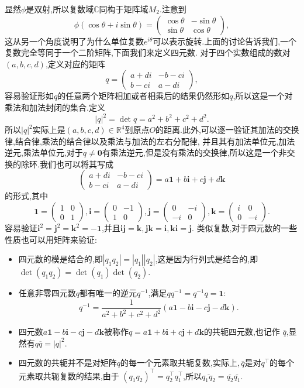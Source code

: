 \documentclass[10pt,a4paper]{ctexbook}
\theoremstyle{definition}
\begin{document}
显然$\phi$是双射,所以复数域$\mathbb{C}$同构于矩阵域$M_2$.注意到
\[
    \phi(\cos\theta+i\sin\theta)=\begin{pmatrix}
        \cos\theta & -\sin\theta \\ \sin\theta & \cos\theta
    \end{pmatrix},
\]
这从另一个角度说明了为什么单位复数$e^{i\theta}$可以表示旋转.上面的讨论告诉我们,一个复数完全等同于一个二阶矩阵,下面我们来定义四元数.%
对于四个实数组成的数对$(a,b,c,d)$,定义对应的矩阵
\[
    q=\begin{pmatrix}
        a+di & -b-ci \\ b-ci & a-di
    \end{pmatrix},
\]
容易验证形如$q$的任意两个矩阵相加或者相乘后的结果仍然形如$q$,所以这是一个对乘法和加法封闭的集合.定义
\[
    |q|^2=\det q=a^2+b^2+c^2+d^2.
\]
所以$|q|^2$实际上是$(a,b,c,d)\in\mathbb{R}^4$到原点$O$的距离.此外,可以逐一验证其加法的交换律,结合律,乘法的结合律以及乘法与加法的左右分配律,%
并且其有加法单位元,加法逆元,乘法单位元,对于$q\neq \mathbf{0}$有乘法逆元,但是没有乘法的交换律,所以这是一个非交换的除环.我们也可以将其写成
\[
    \begin{pmatrix}
        a+di & -b-ci \\ b-ci & a-di
    \end{pmatrix}=a\mathbf{1}+b\mathbf{i}+c\mathbf{j}+d\mathbf{k}
\]
的形式,其中
\[
    \mathbf{1}=\begin{pmatrix}
        1 & 0 \\ 0 & 1
    \end{pmatrix},\mathbf{i}=\begin{pmatrix}
        0 & -1 \\ 1 & 0
    \end{pmatrix},\mathbf{j}=\begin{pmatrix}
        0 & -i \\ -i & 0
    \end{pmatrix},\mathbf{k}=\begin{pmatrix}
        i & 0 \\ 0 & -i
    \end{pmatrix}.
\]
容易验证$\mathbf{i}^2=\mathbf{j}^2=\mathbf{k}^2=-\mathbf{1}$,并且$\mathbf{ij}=\mathbf{k},\mathbf{jk}=\mathbf{i},\mathbf{ki}=\mathbf{j}$.%
类似复数,对于四元数的一些性质也可以用矩阵来验证:
\begin{itemize}[noitemsep]
    \item 四元数的模是结合的,即$|q_1q_2|=|q_1||q_2|$,这是因为行列式是结合的,即$\det(q_1 q_2)=\det(q_1)\det(q_2)$.
    \item 任意非零四元数$q$都有唯一的逆元$q^{-1}$,满足$qq^{-1}=q^{-1}q=\mathbf{1}$:
    \[
        q^{-1}=\frac{1}{a^2+b^2+c^2+d^2}(a\mathbf{1}-b\mathbf{i}-c\mathbf{j}-d\mathbf{k}).
    \]
    \item 四元数$a\mathbf{1}-b\mathbf{i}-c\mathbf{j}-d\mathbf{k}$被称作$q=a\mathbf{1}+b\mathbf{i}+c\mathbf{j}+d\mathbf{k}$的共轭四元数,也记作%
    $\overline{q}$,显然有$q\overline{q}=|q|^2$.
    \item 四元数的共轭并不是对矩阵$q$的每一个元素取共轭复数,实际上,\,$\overline{q}$是对$q^{\top}$的每个元素取共轭复数的结果,由于%
    $(q_1 q_2)^{\top}=q_2^{\top}q_1^{\top}$,所以$\overline{q_1 q_2}=\overline{q_2}\overline{q_1}$.
\end{itemize}
\end{document}
